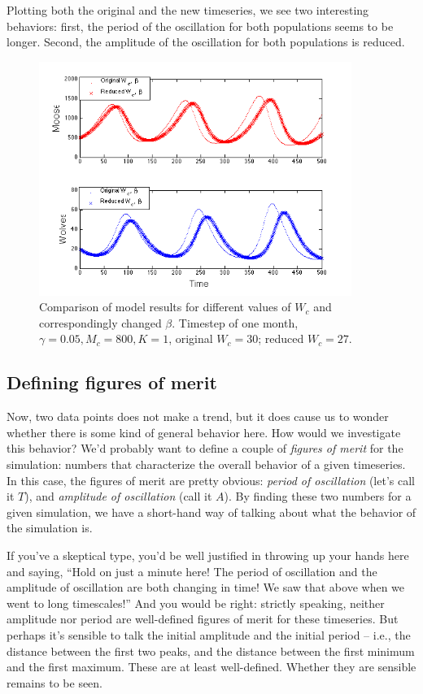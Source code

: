 Plotting both the original and the new timeseries, we see two interesting behaviors: first, the period of the oscillation for both populations seems to be longer.  Second, the amplitude of the oscillation for both populations is reduced.
\begin{figure}[h!]
\includegraphics[width=4in]{figs/MooseBCTimeSeries}
\caption{Comparison of model results for different values of  $W_c$ and correspondingly changed 
$\beta$.  Timestep of one month,  $\gamma = 0.05, M_c = 800, K=1$, original $W_c = 30$; reduced
$W_c = 27$.}
\end{figure}

\subsection{Defining figures of merit}

Now, two data points does not make a trend, but it does cause us to wonder whether there is some kind of general behavior here.  How would we investigate this behavior?  We'd probably want to define a couple of {\em figures of merit} for the simulation:  numbers that characterize the overall behavior of a given timeseries.  In this case, the figures of merit are pretty obvious:  {\em period of oscillation} (let's call it $T$), and {\em amplitude of oscillation} (call it $A$).  By finding these two numbers for a given simulation, we have a short-hand way of talking about what the behavior of the simulation is.


If you've a skeptical type, you'd be well justified in throwing up your hands here and saying, ``Hold on just a minute here!  The period of oscillation and the amplitude of oscillation are both changing in time!  We saw that above when we went to long timescales!''  And you would be right:  strictly speaking, neither amplitude nor period are well-defined figures of merit for these timeseries.  But perhaps it's sensible to talk the initial amplitude and the initial period -- i.e., the distance between the first two peaks, and the distance between the first minimum and the first maximum.  These are at least well-defined.  Whether they are sensible remains to be seen.

